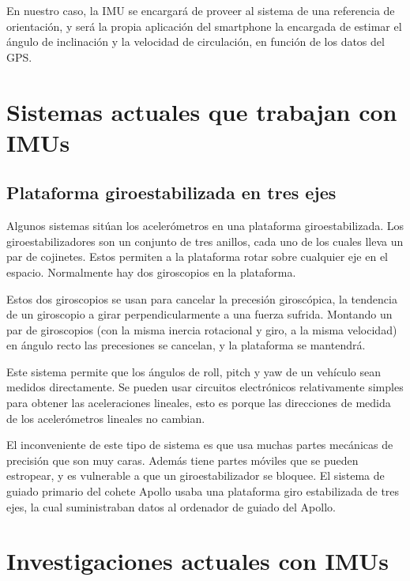 		En nuestro caso, la IMU se encargará de proveer al sistema de una referencia de orientación, y será la propia aplicación del smartphone la encargada de estimar el ángulo de inclinación y la velocidad de circulación, en función de los datos del GPS. 



	\section{Sistemas actuales que trabajan con IMUs}	
	
		\subsection{Plataforma giroestabilizada en tres ejes}
	
		Algunos sistemas sitúan los acelerómetros en una plataforma giroestabilizada. Los giroestabilizadores son un conjunto de tres anillos, cada uno de los cuales lleva un par de cojinetes. Estos permiten a la plataforma rotar sobre cualquier eje en el espacio. Normalmente hay dos giroscopios en la plataforma.

		Estos dos giroscopios se usan para cancelar la precesión giroscópica, la tendencia de un giroscopio a girar perpendicularmente a una fuerza sufrida. Montando un par de giroscopios (con la misma inercia rotacional y giro, a la misma velocidad) en ángulo recto las precesiones se cancelan, y la plataforma se mantendrá.
		
		Este sistema permite que los ángulos de roll, pitch y yaw de un vehículo sean medidos directamente. Se pueden usar circuitos electrónicos relativamente simples para obtener las aceleraciones lineales, esto es porque las direcciones de medida de los acelerómetros lineales no cambian.
		
		El inconveniente de este tipo de sistema es que usa muchas partes mecánicas de precisión que son muy caras. Además tiene partes móviles que se pueden estropear, y es vulnerable a que un giroestabilizador se bloquee. El sistema de guiado primario del cohete Apollo usaba una plataforma giro estabilizada de tres ejes, la cual suministraban datos al ordenador de guiado del Apollo.
		

	
	\section{Investigaciones actuales con IMUs}
	
